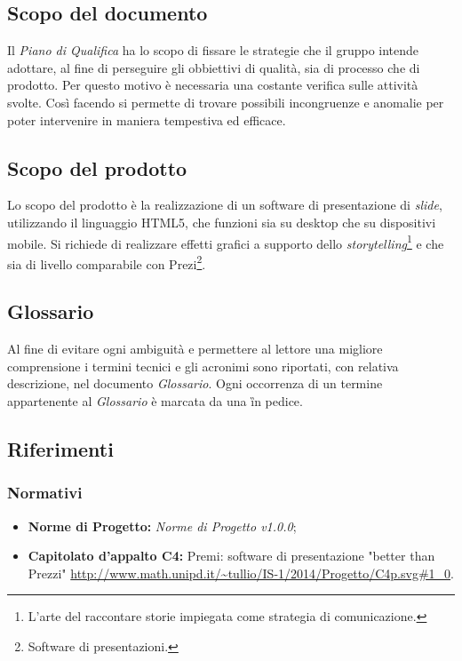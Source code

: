 \subsection{Scopo del documento}
Il \textit{Piano di Qualifica} ha lo scopo di fissare le strategie che il gruppo intende adottare, al fine di perseguire gli obbiettivi di qualità, sia di processo che di prodotto. Per questo motivo è necessaria una costante verifica sulle attività svolte. Così facendo si permette di trovare possibili incongruenze e anomalie per poter intervenire in maniera tempestiva ed efficace.
\subsection{Scopo del prodotto}
Lo scopo del prodotto è la realizzazione di un software di presentazione di \textit{slide}, utilizzando il linguaggio HTML5, che funzioni sia su desktop che su dispositivi mobile. Si richiede di realizzare effetti grafici a supporto dello \textit{storytelling}\footnote{L'arte del raccontare storie impiegata come strategia di comunicazione.} e che sia di livello comparabile con Prezi\footnote{Software di presentazioni.}.
\subsection{Glossario}
Al fine di evitare ogni ambiguità e permettere al lettore una migliore comprensione i termini tecnici e gli acronimi sono riportati, con relativa descrizione, nel documento \textit{Glossario}. 
Ogni occorrenza di un termine appartenente al \textit{Glossario} è marcata da una \G in pedice.
\subsection{Riferimenti}
	\subsubsection{Normativi}
	\begin{itemize}
		\item \textbf{Norme di Progetto:} \textit{Norme di Progetto v1.0.0};
		\item \textbf{Capitolato d'appalto C4:} Premi: software di presentazione "better than Prezzi" \url{http://www.math.unipd.it/~tullio/IS-1/2014/Progetto/C4p.svg#1_0}.
	\end{itemize}
